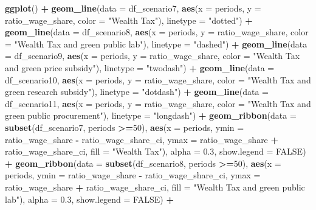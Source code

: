 \documentclass[
]{article}
\newenvironment{Shaded}{\begin{snugshade}}{\end{snugshade}}
\newcommand{\AttributeTok}[1]{\textcolor[rgb]{0.13,0.29,0.53}{#1}}
\newcommand{\ConstantTok}[1]{\textcolor[rgb]{0.56,0.35,0.01}{#1}}
\newcommand{\DecValTok}[1]{\textcolor[rgb]{0.00,0.00,0.81}{#1}}
\newcommand{\FloatTok}[1]{\textcolor[rgb]{0.00,0.00,0.81}{#1}}
\newcommand{\FunctionTok}[1]{\textcolor[rgb]{0.13,0.29,0.53}{\textbf{#1}}}
\newcommand{\NormalTok}[1]{#1}
\newcommand{\SpecialCharTok}[1]{\textcolor[rgb]{0.81,0.36,0.00}{\textbf{#1}}}
\newcommand{\StringTok}[1]{\textcolor[rgb]{0.31,0.60,0.02}{#1}}
\begin{document}
\begin{Shaded}
\begin{Highlighting}[]
\FunctionTok{ggplot}\NormalTok{() }\SpecialCharTok{+}
  \FunctionTok{geom\_line}\NormalTok{(}\AttributeTok{data =}\NormalTok{ df\_scenario7, }\FunctionTok{aes}\NormalTok{(}\AttributeTok{x =}\NormalTok{ periods, }\AttributeTok{y =}\NormalTok{ ratio\_wage\_share, }\AttributeTok{color =} \StringTok{"Wealth Tax"}\NormalTok{), }\AttributeTok{linetype =} \StringTok{"dotted"}\NormalTok{) }\SpecialCharTok{+}
  \FunctionTok{geom\_line}\NormalTok{(}\AttributeTok{data =}\NormalTok{ df\_scenario8, }\FunctionTok{aes}\NormalTok{(}\AttributeTok{x =}\NormalTok{ periods, }\AttributeTok{y =}\NormalTok{ ratio\_wage\_share, }\AttributeTok{color =} \StringTok{"Wealth Tax and green public lab"}\NormalTok{), }\AttributeTok{linetype =} \StringTok{"dashed"}\NormalTok{) }\SpecialCharTok{+}
  \FunctionTok{geom\_line}\NormalTok{(}\AttributeTok{data =}\NormalTok{ df\_scenario9, }\FunctionTok{aes}\NormalTok{(}\AttributeTok{x =}\NormalTok{ periods, }\AttributeTok{y =}\NormalTok{ ratio\_wage\_share, }\AttributeTok{color =} \StringTok{"Wealth Tax and green price subsidy"}\NormalTok{), }\AttributeTok{linetype =} \StringTok{"twodash"}\NormalTok{) }\SpecialCharTok{+}
  \FunctionTok{geom\_line}\NormalTok{(}\AttributeTok{data =}\NormalTok{ df\_scenario10, }\FunctionTok{aes}\NormalTok{(}\AttributeTok{x =}\NormalTok{ periods, }\AttributeTok{y =}\NormalTok{ ratio\_wage\_share, }\AttributeTok{color =} \StringTok{"Wealth Tax and green research subsidy"}\NormalTok{), }\AttributeTok{linetype =} \StringTok{"dotdash"}\NormalTok{) }\SpecialCharTok{+}
  \FunctionTok{geom\_line}\NormalTok{(}\AttributeTok{data =}\NormalTok{ df\_scenario11, }\FunctionTok{aes}\NormalTok{(}\AttributeTok{x =}\NormalTok{ periods, }\AttributeTok{y =}\NormalTok{ ratio\_wage\_share, }\AttributeTok{color =} \StringTok{"Wealth Tax and green public procurement"}\NormalTok{), }\AttributeTok{linetype =} \StringTok{"longdash"}\NormalTok{) }\SpecialCharTok{+}
  \FunctionTok{geom\_ribbon}\NormalTok{(}\AttributeTok{data =} \FunctionTok{subset}\NormalTok{(df\_scenario7, periods }\SpecialCharTok{\textgreater{}=}\DecValTok{50}\NormalTok{), }\FunctionTok{aes}\NormalTok{(}\AttributeTok{x =}\NormalTok{ periods, }\AttributeTok{ymin =}\NormalTok{ ratio\_wage\_share }\SpecialCharTok{{-}}\NormalTok{ ratio\_wage\_share\_ci, }\AttributeTok{ymax =}\NormalTok{ ratio\_wage\_share }\SpecialCharTok{+}\NormalTok{ ratio\_wage\_share\_ci, }\AttributeTok{fill =} \StringTok{"Wealth Tax"}\NormalTok{), }\AttributeTok{alpha =} \FloatTok{0.3}\NormalTok{, }\AttributeTok{show.legend =} \ConstantTok{FALSE}\NormalTok{) }\SpecialCharTok{+}
  \FunctionTok{geom\_ribbon}\NormalTok{(}\AttributeTok{data =} \FunctionTok{subset}\NormalTok{(df\_scenario8, periods }\SpecialCharTok{\textgreater{}=}\DecValTok{50}\NormalTok{), }\FunctionTok{aes}\NormalTok{(}\AttributeTok{x =}\NormalTok{ periods, }\AttributeTok{ymin =}\NormalTok{ ratio\_wage\_share }\SpecialCharTok{{-}}\NormalTok{ ratio\_wage\_share\_ci, }\AttributeTok{ymax =}\NormalTok{ ratio\_wage\_share }\SpecialCharTok{+}\NormalTok{ ratio\_wage\_share\_ci, }\AttributeTok{fill =} \StringTok{"Wealth Tax and green public lab"}\NormalTok{), }\AttributeTok{alpha =} \FloatTok{0.3}\NormalTok{, }\AttributeTok{show.legend =} \ConstantTok{FALSE}\NormalTok{) }\SpecialCharTok{+}

\end{Highlighting}
\end{Shaded}
\end{document}
